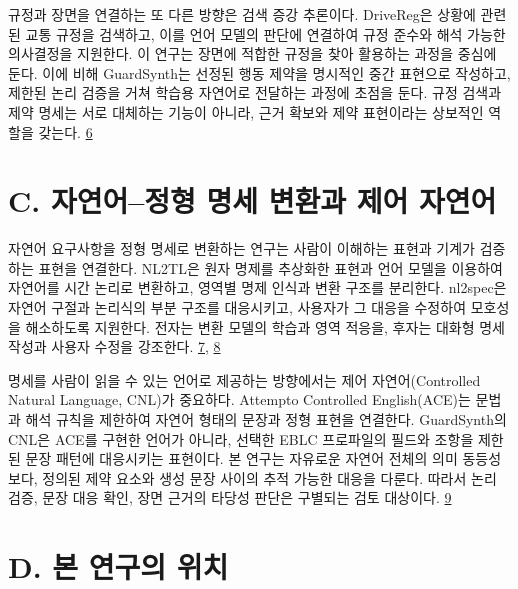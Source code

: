 \documentclass[11pt,a4paper]{article}
\begin{document}
규정과 장면을 연결하는 또 다른 방향은 검색 증강 추론이다. DriveReg은 상황에 관련된 교통 규정을 검색하고, 이를 언어 모델의 판단에 연결하여 규정 준수와 해석 가능한 의사결정을 지원한다. 이 연구는 장면에 적합한 규정을 찾아 활용하는 과정을 중심에 둔다. 이에 비해 GuardSynth는 선정된 행동 제약을 명시적인 중간 표현으로 작성하고, 제한된 논리 검증을 거쳐 학습용 자연어로 전달하는 과정에 초점을 둔다. 규정 검색과 제약 명세는 서로 대체하는 기능이 아니라, 근거 확보와 제약 표현이라는 상보적인 역할을 갖는다. \href{\detokenize{https://ojs.aaai.org/index.php/AAAI/article/view/41168}}{6}\par

\section*{C. 자연어–정형 명세 변환과 제어 자연어}

자연어 요구사항을 정형 명세로 변환하는 연구는 사람이 이해하는 표현과 기계가 검증하는 표현을 연결한다. NL2TL은 원자 명제를 추상화한 표현과 언어 모델을 이용하여 자연어를 시간 논리로 변환하고, 영역별 명제 인식과 변환 구조를 분리한다. nl2spec은 자연어 구절과 논리식의 부분 구조를 대응시키고, 사용자가 그 대응을 수정하여 모호성을 해소하도록 지원한다. 전자는 변환 모델의 학습과 영역 적응을, 후자는 대화형 명세 작성과 사용자 수정을 강조한다. \href{\detokenize{https://aclanthology.org/2023.emnlp-main.985/}}{7}, \href{\detokenize{https://arxiv.org/abs/2303.04864}}{8}\par

명세를 사람이 읽을 수 있는 언어로 제공하는 방향에서는 제어 자연어(Controlled Natural Language, CNL)가 중요하다. Attempto Controlled English(ACE)는 문법과 해석 규칙을 제한하여 자연어 형태의 문장과 정형 표현을 연결한다. GuardSynth의 CNL은 ACE를 구현한 언어가 아니라, 선택한 EBLC 프로파일의 필드와 조항을 제한된 문장 패턴에 대응시키는 표현이다. 본 연구는 자유로운 자연어 전체의 의미 동등성보다, 정의된 제약 요소와 생성 문장 사이의 추적 가능한 대응을 다룬다. 따라서 논리 검증, 문장 대응 확인, 장면 근거의 타당성 판단은 구별되는 검토 대상이다. \href{\detokenize{https://attempto.ifi.uzh.ch/site/pubs/papers/FLAIRS0601FuchsN.pdf}}{9}\par

\section*{D. 본 연구의 위치}
\end{document}
